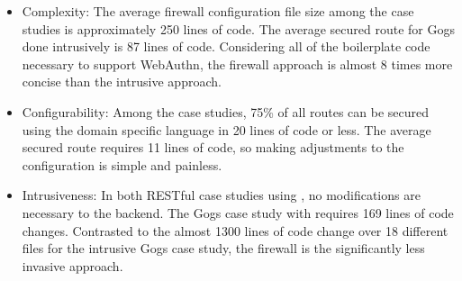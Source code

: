 \begin{itemize}[nosep]
\item Complexity: The average firewall configuration file size among the case studies is approximately 250 lines of code. The average secured route for Gogs done intrusively is 87 lines of code. Considering all of the boilerplate code necessary to support WebAuthn, the firewall approach is almost 8 times more concise than the intrusive approach.





\item Configurability: Among the case studies, 75\% of all routes can be secured using the domain specific language in 20 lines of code or less. The average secured route requires 11 lines of code, so making adjustments to the configuration is simple and painless. 


\item Intrusiveness: In both RESTful case studies using \sys{}, no modifications are necessary to the backend. The Gogs case study with \sys{} requires 169 lines of code changes. Contrasted to the almost 1300 lines of code change over 18 different files for the intrusive Gogs case study, the firewall is the significantly less invasive approach.


\end{itemize}

